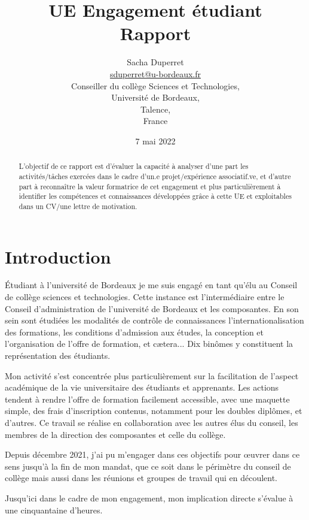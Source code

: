 \documentclass{article}
\title{{\huge UE Engagement étudiant\\Rapport}}
\author{$ $\\{\LARGE Sacha Duperret}\\ $ $\\ \href{mailto:sduperret@u-bordeaux.fr}{sduperret@u-bordeaux.fr}\\Conseiller du collège Sciences et Technologies,\\Université de Bordeaux,\\Talence,\\France}
\date{7 mai 2022}
\begin{document}
\maketitle

\vspace{20pt}

\tableofcontents

\vspace{50pt}

\begin{abstract}
L'objectif de ce rapport est d'évaluer la capacité à analyser d’une part les activités/tâches exercées dans le cadre d'un.e projet/expérience associatif.ve, et d’autre part à reconnaître la valeur formatrice de cet engagement et plus particulièrement à identifier les compétences et connaissances développées grâce à cette UE et exploitables dans un CV/une lettre de motivation.
\end{abstract}

\newpage \section*{Introduction}

Étudiant à l'université de Bordeaux je me suis engagé en tant qu'élu au Conseil de collège sciences et technologies. 
Cette instance est l’intermédiaire entre le Conseil d'administration de l'université de Bordeaux et les composantes. 
En son sein sont étudiées les modalités de contrôle de connaissances l’internationalisation des formations, les conditions d'admission aux études, la conception et l'organisation de l'offre de formation, et cætera... 
Dix binômes y constituent la représentation des étudiants. 

Mon activité s'est concentrée plus particulièrement sur la facilitation de l'aspect académique de la vie universitaire des étudiants et apprenants. Les actions tendent à rendre l’offre de formation facilement accessible, avec une maquette simple, des frais d'inscription contenus, notamment pour les doubles diplômes, et d'autres. Ce travail se réalise en collaboration avec les autres élus du conseil, les membres de la direction des composantes et celle du collège. 

Depuis décembre 2021, j’ai pu m’engager dans ces objectifs pour œuvrer dans ce sens jusqu’à la fin de mon mandat, que ce soit dans le périmètre du conseil de collège mais aussi dans les réunions et groupes de travail qui en découlent. 

\newpage
Jusqu'ici dans le cadre de mon engagement, mon implication directe s’évalue à une cinquantaine d'heures. 
\end{document}
